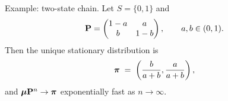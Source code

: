 \documentclass[aspectratio=169]{beamer}
\begin{document}
\begin{frame}{Example: two-state chain.}
Let $S=\{0,1\}$ and
\[
\mathbf{P} = \begin{pmatrix} 1-a & a \\ b & 1-b \end{pmatrix}, \qquad a,b\in(0,1).
\]
Then the unique stationary distribution is
\[
\mbox{\boldmath$\pi$} \;=\; \left( \frac{b}{a+b}, \frac{a}{a+b} \right),
\]
and $\mbox{\boldmath $\mu$} \mathbf{P}^n \to \mbox{\boldmath$\pi$}$ exponentially fast as $n\to\infty$.
\end{frame}
\end{document}
